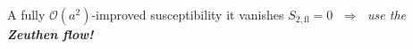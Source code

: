 \begin{block}{A fully $\mathcal{O}(a^2)$-improved susceptibility}
  it vanishes $S_{2,\mathrm{fl}} = 0$ $\;\Rightarrow\;$ \emph{use the \textbf{Zeuthen flow!}~\cite{Ramos:2015baa}}

\end{block}

